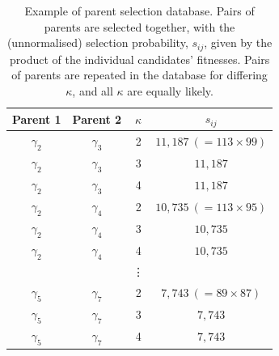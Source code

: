 \begin{table}
    \begin{center}
        \begin{tabular}{cccc}
            Parent 1 & Parent 2 & $\kappa$ & $s_{ij}$ \\
            \hline 
            $\gamma_2$ & $\gamma_3$ & 2 & $11,187 \ (=113 \times 99 )$ \\
            $\gamma_2$ & $\gamma_3$ & 3 & $11,187$ \\
            $\gamma_2$ & $\gamma_3$ & 4 & $11,187$ \\

            $\gamma_2$ & $\gamma_4$ & 2 & $10,735 \ (=113 \times 95)$ \\
            $\gamma_2$ & $\gamma_4$ & 3 & $10,735$ \\
            $\gamma_2$ & $\gamma_4$ & 4 & $10,735$ \\

             & & \vdots & \\

            $\gamma_5$ & $\gamma_7$ & 2 & $7,743 \ (=89 \times 87)$ \\
            $\gamma_5$ & $\gamma_7$ & 3 & $7,743$ \\
            $\gamma_5$ & $\gamma_7$ & 4 & $7,743$ \\

        \end{tabular}
    \end{center}
    \caption[Genetic algorithm parent selection database]{
        Example of parent selection database. 
        Pairs of parents are selected together, with the (unnormalised) selection probability, $s_{ij}$, 
        given by the product of the individual candidates' fitnesses. 
        Pairs of parents are repeated in the database for differing $\kappa$, 
            and all $\kappa$ are equally likely. 
    }
    \label{table:selection_database}
\end{table}

